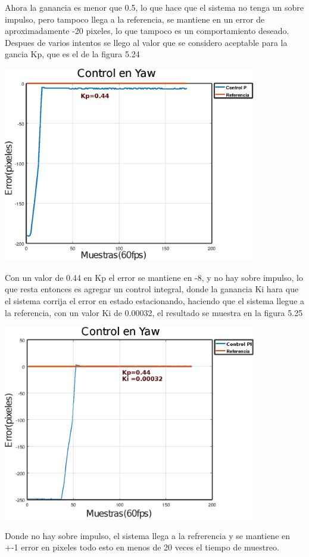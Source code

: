 Ahora la ganancia es menor que 0.5, lo que hace que el sistema no tenga un sobre impulso, pero tampoco llega 
a la referencia, se mantiene en un error de aproximadamente -20 pixeles, lo que tampoco es un comportamiento deseado.
Despues de varios intentos se llego al valor que se considero aceptable para la gancia Kp, que es el de 
la figura 5.24
\begin{center}
	\includegraphics[width=0.83\textwidth]{Contenido/Cuerpo/Capitulo5/Fig32.eps}
	\label{Fig4}
\end{center}
Con un valor de 0.44 en Kp el error se mantiene en -8, y no hay sobre impulso, lo que resta entonces es agregar
un control integral, donde la ganancia Ki hara que el sistema corrija el error en estado estacionando, haciendo
que el sistema llegue a la referencia, con un valor Ki de 0.00032, el resultado se muestra en la figura 5.25
\begin{center}
	\includegraphics[width=0.83\textwidth]{Contenido/Cuerpo/Capitulo5/Fig33.eps}
	\label{Fig4}
\end{center}
Donde no hay sobre impulso, el sistema llega a la refrerencia y se mantiene en +-1 error en pixeles todo esto
en menos de 20 veces el tiempo de muestreo.